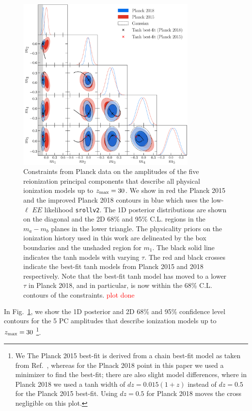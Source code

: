 \documentclass[prd,twocolumn,amsmath,amssymb,floatfix,superscriptaddress,nofootinbib]{revtex4-1}
\newcommand{\zmax}{z_{\rm max}}
\newcommand{\ch}[1]{\textcolor{red}{#1}}
\begin{document}
\begin{figure}
\includegraphics[width=0.8\textwidth]{paper/plots/plot_mj_triangle_t18_r12_t19_t20_vs_pl18_pc_zmax30_pliklite_srollv2_1015_wTauTrajectory_pl15_wTanhML_wGaussEllipse.pdf}

\caption{Constraints from Planck data on the amplitudes of the five reionization principal components that describe all physical ionization models up to $z_{\rm max} = 30$. We show in red the Planck 2015 and the improved Planck 2018 contours in blue which uses the low-$\ell$ $EE$ likelihood \texttt{srollv2}. The 1D posterior distributions are shown on the diagonal and the 2D 68\% and 95\% C.L. regions in the $m_a-m_b$ planes in the lower triangle. The physicality priors on the ionization history used in this work are delineated by the box boundaries and the unshaded region for $m_1$. The black solid line indicates the tanh models with varying $\tau$. The red and black crosses indicate the best-fit tanh models from Planck 2015 and 2018 respectively. Note that the best-fit tanh model has moved to a lower $\tau$ in Planck 2018, and in particular, is now within the 68\% C.L. contours of the constraints. \ch{plot done}
}
\label{fig:plot_mjs_2018_vs_2015}
\end{figure}
%
%
In Fig.~\ref{fig:plot_mjs_2018_vs_2015}, we show the 1D posterior and 2D 68\% and 95\% confidence level contours for the 5 PC amplitudes that describe ionization models up to $\zmax=30$
%
\footnote{We The Planck 2015 best-fit is derived from a chain best-fit model as taken from Ref.~\cite{Heinrich:2016ojb}, whereas for the Plnack 2018 point in this paper we used a minimizer to find the best-fit; there are also slight model differences, where in Planck 2018 we used a tanh width of $dz = 0.015(1+z)$ instead of $dz = 0.5$ for the Planck 2015 best-fit. Using $dz = 0.5$ for Planck 2018 moves the cross negligible on this plot.}.
\end{document}
